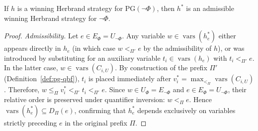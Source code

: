 \documentclass[runningheads]{llncs}
\DeclareMathOperator{\vars}{vars}
\newcommand{\PG}{\mathrm{PG}}
\begin{document}
\begin{lemma}
    \label{lem:strategy-correspondence}
    If $h$ is a winning Herbrand strategy for $\PG(\neg\Phi)$, then $h^*$ is an admissible winning Herbrand strategy for $\neg\Phi$.
\end{lemma}
\begin{proof}
    \emph{Admissibility.}
    Let $e \in E_\Phi = U_{\neg\Phi}$.
    Any variable $w \in \vars(h_e^*)$ either appears directly in $h_e$ (in which case $w <_{\Pi'} e$ by the admissibility of $h$), or was introduced by substituting for an auxiliary variable $t_i \in \vars(h_e)$ with $t_i <_{\Pi'} e$.
    In the latter case, $w \in \vars(C_{i,U})$.
    By construction of the prefix $\Pi'$ (Definition~\ref{def:pg-qbf}), $t_i$ is placed immediately after $v_i^* = \max_{<_\Pi}\vars(C_{i,U})$.
    Therefore, $w \le_\Pi v_i^* <_{\Pi'} t_i <_{\Pi'} e$.
    Since $w \in U_\Phi = E_{\neg\Phi}$ and $e \in E_\Phi = U_{\neg\Phi}$, their relative order is preserved under quantifier inversion: $w <_\Pi e$.
    Hence $\vars(h_e^*) \subseteq D_\Pi(e)$, confirming that $h_e^*$ depends exclusively on variables strictly preceding $e$ in the original prefix $\Pi$.


\end{proof}
\end{document}
